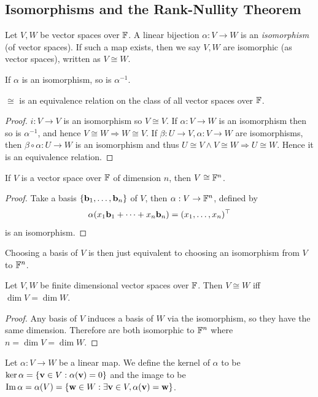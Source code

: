 \documentclass[a4paper,11pt]{article}
\begin{document}
\subsection{Isomorphisms and the Rank-Nullity Theorem}
\begin{definition}
    Let $V,W$ be vector spaces over ${\mathbb{F}}$.
    A linear bijection $\alpha:V\to W$ is an \textit{isomorphism} (of vector spaces).
    If such a map exists, then we say $V,W$ are isomorphic (as vector spaces), written as $V\cong W$.
\end{definition}
\begin{remark}
    If $\alpha$ is an isomorphism, so is $\alpha^{-1}$.
\end{remark}
\begin{lemma}
    $\cong$ is an equivalence relation on the class of all vector spaces over ${\mathbb{F}}$.
\end{lemma}
\begin{proof}
    $i:V\to V$ is an isomorphism so $ V \cong V $. If $ \alpha:V\to W $ is an isomorphism then so is $ \alpha^{-1} $, and hence $ V \cong W \Rightarrow W \cong V $. If $ \beta:U\to V,\alpha:V\to W $ are isomorphisms, then $ \beta\circ \alpha:U\to W $ is an isomorphism and thus $ U \cong V \land V \cong W \Rightarrow U \cong W $. Hence it is an equivalence relation.
\end{proof}
\begin{theorem}
    If $V$ is a vector space over ${\mathbb{F}}$ of dimension $n$, then $V\cong {\mathbb{F}}^n$.
\end{theorem}
\begin{proof}
    Take a basis $\{{\bf b}_1,\ldots,{\bf b}_n\}$ of $V$, then $ \alpha:V\to {\mathbb{F}}^n $, defined by
    $$\alpha(x_1{\bf b}_1+\cdots+x_n{\bf b}_n)=(x_1,\ldots,x_n)^\top$$
    is an isomorphism.
\end{proof}
\begin{remark}
    Choosing a basis of $V$ is then just equivalent to choosing an isomorphism from $V$ to ${\mathbb{F}}^n$.
\end{remark}
\begin{theorem}\label{isom iff same dim}
    Let $V,W$ be finite dimensional vector spaces over ${\mathbb{F}}$.
    Then $V\cong W$ iff $\dim V=\dim W$.
\end{theorem}
\begin{proof}
    Any basis of $V$ induces a basis of $W$ via the isomorphism, so they have the same dimension.
    Therefore are both isomorphic to ${\mathbb{F}}^n$ where $n=\dim V=\dim W$.
\end{proof}
\begin{definition}
    Let $\alpha:V\to W$ be a linear map.
    We define the kernel of $\alpha$ to be $\ker\alpha=\{{\bf v}\in V:\alpha({\bf v})=0\}$ and the image to be $\operatorname{Im}\alpha=\alpha(V)=\{{\bf w}\in W:\exists {\bf v}\in V,\alpha({\bf v})={\bf w}\}$.
\end{definition}
\end{document}
